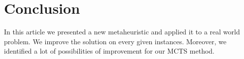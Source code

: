 \documentclass[a4paper,twocolumn]{article}
\begin{document}
\section{Conclusion}

In this article we presented a new metaheuristic and applied it to a
real world problem.  We improve the solution on every given
instances.  Moreover, we identified a lot of possibilities of
improvement for our MCTS method.



\end{document}
